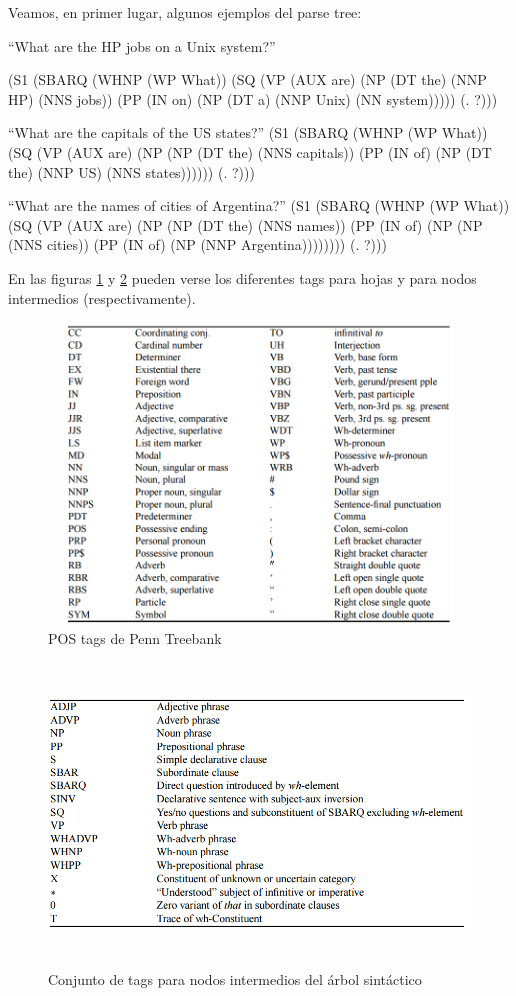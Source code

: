 Veamos, en primer lugar, algunos ejemplos del parse tree:

``What are the HP jobs on a Unix system?''

(S1 (SBARQ (WHNP (WP What)) (SQ (VP (AUX are) (NP (DT the) (NNP HP) (NNS jobs)) (PP (IN on) (NP (DT a) (NNP Unix) (NN system))))) (. ?)))

``What are the capitals of the US states?''
(S1 (SBARQ (WHNP (WP What)) (SQ (VP (AUX are) (NP (NP (DT the) (NNS capitals)) (PP (IN of) (NP (DT the) (NNP US) (NNS states)))))) (. ?)))


``What are the names of cities of Argentina?''
(S1 (SBARQ (WHNP (WP What)) (SQ (VP (AUX are) (NP (NP (DT the) (NNS names)) (PP (IN of) (NP (NP (NNS cities)) (PP (IN of) (NP (NNP Argentina)))))))) (. ?)))

En las figuras \ref{fig:word-tags} y \ref{fig:syntax-tags} pueden verse los diferentes tags para hojas y para nodos intermedios (respectivamente).


\begin{figure}[H]
  \centering
    \includegraphics[width=12.823cm,height=8.004cm]{graficos/fuentes/WordTags.png}
  \caption{POS tags de Penn Treebank}
  \label{fig:word-tags}
\end{figure}


\begin{figure}[H]
  \centering
    \includegraphics[width=12.823cm,height=8.004cm]{graficos/fuentes/SyntaxTags.png}
  \caption{Conjunto de tags para nodos intermedios del árbol sintáctico}
  \label{fig:syntax-tags}
\end{figure}



